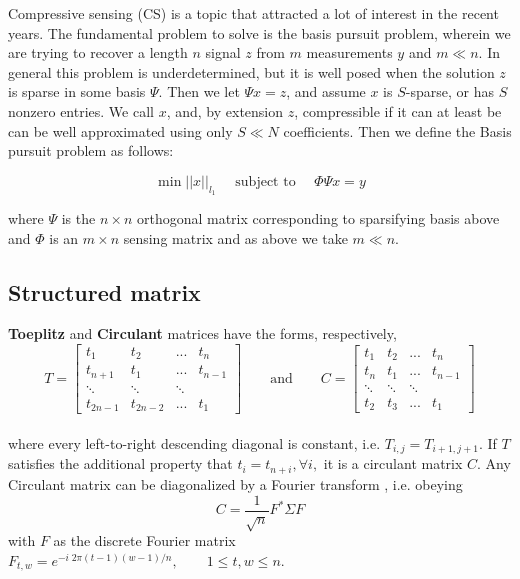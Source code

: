 Compressive sensing (CS) is a topic that attracted a lot of interest in the recent years.
The fundamental problem to solve is the basis pursuit problem, wherein we are trying to 
recover a length $n$ signal $z$ from $m$ measurements $y$ and $m \ll n$. In general 
this problem is underdetermined, but it is well posed when the solution $z$ is sparse 
in some basis $\Psi$. Then we let $\Psi x = z$, and assume $x$ is $S$-sparse, or has $S$ nonzero entries. We call $x$, and, by extension $z$, compressible if it can at least be can be well approximated using only $S \ll N$ coefficients. Then we define the Basis pursuit problem as follows:

\begin{equation}
\min ||x||_{l_1} \quad \text{ subject to } \quad \Phi \Psi x=y
\end{equation}


where $\Psi$ is the $n \times n$ orthogonal matrix corresponding to sparsifying basis
above and $\Phi$ is an $m \times n$ sensing matrix and as above we take $m\ll n$. 

\subsection*{Structured matrix}
\textbf{Toeplitz} and \textbf{Circulant} matrices have the forms, respectively,
\\

$$
T = \begin{bmatrix}
t_{1}    & t_{2}    & ...    & t_{n}   \\[0.3em]
t_{n+1}  & t_{1}    & ...    & t_{n-1} \\[0.3em]
\ddots   & \ddots   & \ddots &         \\[0.3em]
t_{2n-1} & t_{2n-2} & ...    & t_{1}         
\end{bmatrix}
\qquad \text{and} \qquad
C = \begin{bmatrix}
t_{1}  & t_{2}  & ...    & t_{n}   \\[0.3em]
t_{n}  & t_{1}  & ...    & t_{n-1} \\[0.3em]
\ddots & \ddots & \ddots &         \\[0.3em]
t_{2}  & t_{3}  & ...    & t_{1}        
\end{bmatrix} 
$$
\\
where every left-to-right descending diagonal is constant, i.e. $T_{i,j}=T_{i+1,j+1}.$ If $T$ satisfies the additional property that $t_{i}=t_{n+i}, \forall i,$ it is a circulant matrix $C$.
	Any Circulant matrix can be diagonalized by a Fourier transform \cite{wotao}, i.e. obeying
	$$ C=\frac{1}{\sqrt{n}} F^* \Sigma F $$ with $F$ as the discrete Fourier matrix
	$F_{t,w}=e^{-i\; 2\pi(t-1)(w-1)/n}, \qquad 1 \le t,w \le n$.
	
